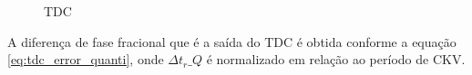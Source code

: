 



\begin{figure}[h!]
	\caption{TDC }
	\begin{center}
		\hfil
	\end{center}
	\label{fig:tdc_harware}
\end{figure}


A diferença de fase fracional que é a saída do TDC é obtida conforme a equação \ref{eq:tdc_error_quanti}, onde $\Delta t_r\_Q$ é normalizado em relação ao período de CKV.


